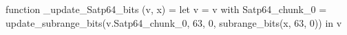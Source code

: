 function _update_Satp64_bits (v, x) = let v = { v with Satp64_chunk_0 = update_subrange_bits(v.Satp64_chunk_0, 63, 0, subrange_bits(x, 63, 0)) } in
  v

